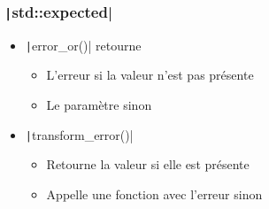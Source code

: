 \documentclass[C++.tex]{subfiles}
\begin{document}
\begin{frame}[fragile]
	\frametitle{\texttt|std::expected|}
	\begin{itemize}
		\item \texttt|error_or()| retourne
		\begin{itemize}
			\item L'erreur si la valeur n'est pas présente
			\item Le paramètre sinon
		\end{itemize}
		\item \texttt|transform_error()|
		\begin{itemize}
			\item Retourne la valeur si elle est présente
			\item Appelle une fonction avec l'erreur sinon
		\end{itemize}
	\end{itemize}



\end{frame}
\end{document}
